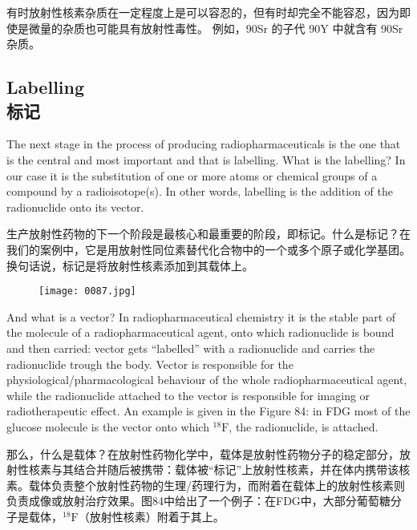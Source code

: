 \documentclass[dvipsnames, svgnames,a4paper,11pt]{article}
\begin{document}
有时放射性核素杂质在一定程度上是可以容忍的，但有时却完全不能容忍，因为即使是微量的杂质也可能具有放射性毒性。 例如，90Sr 的子代 90Y 中就含有 90Sr 杂质。

\subsection{Labelling \\标记}

The next stage in the process of producing radiopharmaceuticals is the one that is
the central and most important and that is labelling. What is the labelling? In our
case it is the substitution of one or more atoms or chemical groups of a compound
by a radioisotope(s). In other words, labelling is the addition of the radionuclide onto
its vector.

生产放射性药物的下一个阶段是最核心和最重要的阶段，即标记。什么是标记？在我们的案例中，它是用放射性同位素替代化合物中的一个或多个原子或化学基团。换句话说，标记是将放射性核素添加到其载体上。

\begin{figure}[H]
    \centering
    \texttt{[image: 0087.jpg]}
     \label{fig84}
\end{figure}

And what is a vector? In radiopharmaceutical chemistry it is the stable part of the
molecule of a radiopharmaceutical agent, onto which radionuclide is bound and then
carried: vector gets “labelled” with a radionuclide and carries the radionuclide trough the body. Vector is responsible for the physiological/pharmacological behaviour of
the whole radiopharmaceutical agent, while the radionuclide attached to the vector is
responsible for imaging or radiotherapeutic effect. An example is given in the Figure
84: in FDG most of the glucose molecule is the vector onto which ${}^{18}\mathrm{F}$, the
radionuclide, is attached.

那么，什么是载体？在放射性药物化学中，载体是放射性药物分子的稳定部分，放射性核素与其结合并随后被携带：载体被“标记”上放射性核素，并在体内携带该核素。载体负责整个放射性药物的生理/药理行为，而附着在载体上的放射性核素则负责成像或放射治疗效果。图84中给出了一个例子：在FDG中，大部分葡萄糖分子是载体，${}^{18}\mathrm{F}$（放射性核素）附着于其上。
\end{document}
